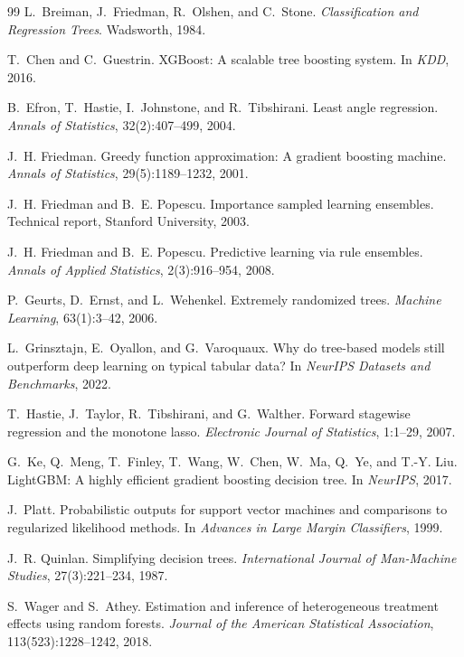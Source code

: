 \documentclass[11pt,a4paper]{article}
\theoremstyle{definition}
\begin{document}
\begin{thebibliography}{99}
L.~Breiman, J.~Friedman, R.~Olshen, and C.~Stone.
\newblock \emph{Classification and Regression Trees}.
\newblock Wadsworth, 1984.

T.~Chen and C.~Guestrin.
\newblock XGBoost: A scalable tree boosting system.
\newblock In \emph{KDD}, 2016.

B.~Efron, T.~Hastie, I.~Johnstone, and R.~Tibshirani.
\newblock Least angle regression.
\newblock \emph{Annals of Statistics}, 32(2):407--499, 2004.

J.~H. Friedman.
\newblock Greedy function approximation: A gradient boosting machine.
\newblock \emph{Annals of Statistics}, 29(5):1189--1232, 2001.

J.~H. Friedman and B.~E. Popescu.
\newblock Importance sampled learning ensembles.
\newblock Technical report, Stanford University, 2003.

J.~H. Friedman and B.~E. Popescu.
\newblock Predictive learning via rule ensembles.
\newblock \emph{Annals of Applied Statistics}, 2(3):916--954, 2008.

P.~Geurts, D.~Ernst, and L.~Wehenkel.
\newblock Extremely randomized trees.
\newblock \emph{Machine Learning}, 63(1):3--42, 2006.

L.~Grinsztajn, E.~Oyallon, and G.~Varoquaux.
\newblock Why do tree-based models still outperform deep learning on typical
tabular data?
\newblock In \emph{NeurIPS Datasets and Benchmarks}, 2022.

T.~Hastie, J.~Taylor, R.~Tibshirani, and G.~Walther.
\newblock Forward stagewise regression and the monotone lasso.
\newblock \emph{Electronic Journal of Statistics}, 1:1--29, 2007.

G.~Ke, Q.~Meng, T.~Finley, T.~Wang, W.~Chen, W.~Ma, Q.~Ye, and T.-Y. Liu.
\newblock LightGBM: A highly efficient gradient boosting decision tree.
\newblock In \emph{NeurIPS}, 2017.

J.~Platt.
\newblock Probabilistic outputs for support vector machines and comparisons to
regularized likelihood methods.
\newblock In \emph{Advances in Large Margin Classifiers}, 1999.

J.~R. Quinlan.
\newblock Simplifying decision trees.
\newblock \emph{International Journal of Man-Machine Studies}, 27(3):221--234,
1987.

S.~Wager and S.~Athey.
\newblock Estimation and inference of heterogeneous treatment effects using
random forests.
\newblock \emph{Journal of the American Statistical Association},
113(523):1228--1242, 2018.

\end{thebibliography}
\end{document}
